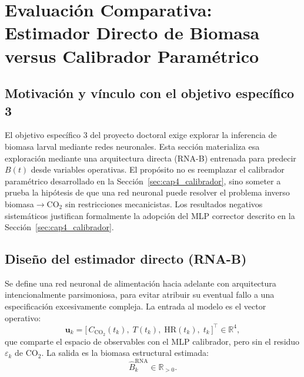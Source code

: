 \section{Evaluación Comparativa: Estimador Directo de Biomasa versus Calibrador Paramétrico}
\label{sec:cap4_comparativa}

\subsection{Motivación y vínculo con el objetivo específico 3}
El objetivo específico 3 del proyecto doctoral exige explorar la inferencia de biomasa larval mediante redes neuronales. Esta sección materializa esa exploración mediante una arquitectura directa (RNA-B) entrenada para predecir $B(t)$ desde variables operativas. El propósito no es reemplazar el calibrador paramétrico desarrollado en la Sección~\ref{sec:cap4_calibrador}, sino someter a prueba la hipótesis de que una red neuronal puede resolver el problema inverso biomasa$\rightarrow$CO$_2$ sin restricciones mecanicistas. Los resultados negativos sistemáticos justifican formalmente la adopción del MLP corrector descrito en la Sección~\ref{sec:cap4_calibrador}.

\subsection{Diseño del estimador directo (RNA-B)}
\label{subsec:rna_b_diseno}
Se define una red neuronal de alimentación hacia adelante con arquitectura intencionalmente parsimoniosa, para evitar atribuir su eventual fallo a una especificación excesivamente compleja. La entrada al modelo es el vector operativo:
\begin{equation}
\mathbf{u}_k = \big[\, C_{\mathrm{CO_2}}(t_k),\; T(t_k),\; \mathrm{HR}(t_k),\; t_k \,\big]^\top \in \mathbb{R}^4,
\end{equation}
que comparte el espacio de observables con el MLP calibrador, pero sin el residuo $\varepsilon_k$ de CO$_2$. La salida es la biomasa estructural estimada:
\begin{equation}
\hat{B}_k^{\mathrm{RNA}} \in \mathbb{R}_{>0}.
\end{equation}

